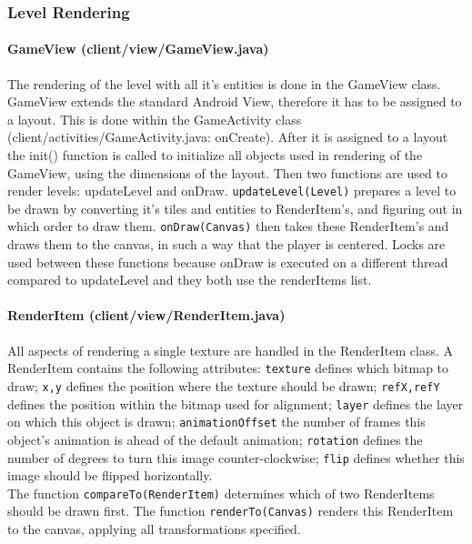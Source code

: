\documentclass[../main.tex]{subfiles}
\begin{document}
		\subsubsection{Level Rendering}
        \paragraph{GameView (\tiny client/view/GameView.java\normalsize)}
        The rendering of the level with all it's entities is done in the GameView class. GameView extends the standard Android View, therefore it has to be assigned to a layout. This is done within the GameActivity class (\tiny client/activities/GameActivity.java: onCreate\normalsize). After it is assigned to a layout the init() function is called to initialize all objects used in rendering of the GameView, using the dimensions of the layout. Then two functions are used to render levels: updateLevel and onDraw. \texttt{updateLevel(Level)} prepares a level to be drawn by converting it's tiles and entities to RenderItem's, and figuring out in which order to draw them. \texttt{onDraw(Canvas)} then takes these RenderItem's and draws them to the canvas, in such a way that the player is centered. Locks are used between these functions because onDraw is executed on a different thread compared to updateLevel and they both use the renderItems list.

        \paragraph{RenderItem (\tiny client/view/RenderItem.java\normalsize)} All aspects of rendering a single texture are handled in the RenderItem class. A RenderItem contains the following attributes: \texttt{texture} defines which bitmap to draw; \texttt{x,y} defines the position where the texture should be drawn; \texttt{refX,refY} defines the position within the bitmap used for alignment; \texttt{layer} defines the layer on which this object is drawn; \texttt{animationOffset} the number of frames this object's animation is ahead of the default animation; \texttt{rotation} defines the number of degrees to turn this image counter-clockwise; \texttt{flip} defines whether this image should be flipped horizontally.\\
        The function \texttt{compareTo(RenderItem)} determines which of two RenderItems should be drawn first. The function \texttt{renderTo(Canvas)} renders this RenderItem to the canvas, applying all transformations specified.
\end{document}
